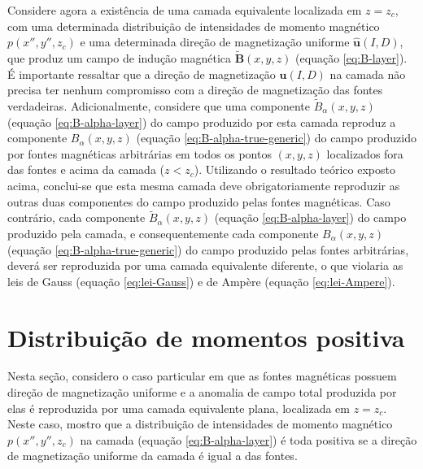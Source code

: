 Considere agora a existência de uma camada equivalente localizada em $z = z_{c}$, com uma determinada 
distribuição de intensidades de momento magnético $p(x'', y'', z_{c})$ e uma determinada 
direção de magnetização uniforme $\hat{\mathbf{u}}(I, D)$, que produz um campo de indução 
magnética $\tilde{\mathbf{B}}(x, y, z)$ (equação \ref{eq:B-layer}). 
É importante ressaltar que a direção de magnetização $\hat{\mathbf{u}}(I, D)$ na camada não 
precisa ter nenhum compromisso com a direção de magnetização das fontes verdadeiras.
Adicionalmente, 
considere que uma componente $\tilde{B}_{\alpha}(x, y, z)$ (equação \ref{eq:B-alpha-layer}) 
do campo produzido por esta camada reproduz a componente $B_{\alpha}(x, y, z)$ (equação \ref{eq:B-alpha-true-generic}) 
do campo produzido por fontes magnéticas arbitrárias em todos os pontos $(x, y, z)$ localizados fora das fontes e acima 
da camada ($z < z_{c}$). Utilizando o resultado teórico exposto acima, conclui-se que 
esta mesma camada deve obrigatoriamente reproduzir as outras duas componentes do campo produzido 
pelas fontes magnéticas. Caso contrário, cada componente $\tilde{B}_{\alpha}(x, y, z)$ 
(equação \ref{eq:B-alpha-layer}) do campo produzido pela camada, e consequentemente cada componente 
$B_{\alpha}(x, y, z)$ (equação \ref{eq:B-alpha-true-generic}) do campo produzido pelas fontes arbitrárias, 
deverá ser reproduzida por uma camada equivalente diferente, o que violaria as leis de 
Gauss (equação \ref{eq:lei-Gauss}) e de Ampère (equação \ref{eq:lei-Ampere}).


\section{Distribuição de momentos positiva}
\label{sec:distribuicao-positiva}

Nesta seção, considero o caso particular em que as fontes magnéticas possuem 
direção de magnetização uniforme e a anomalia de campo total produzida por elas é 
reproduzida por uma camada equivalente plana, localizada em $z = z_{c}$. 
Neste caso, mostro que a distribuição de intensidades de momento magnético 
$p(x'', y'', z_{c})$ na camada (equação \ref{eq:B-alpha-layer}) é toda positiva 
se a direção de magnetização uniforme da camada é igual a das fontes.

